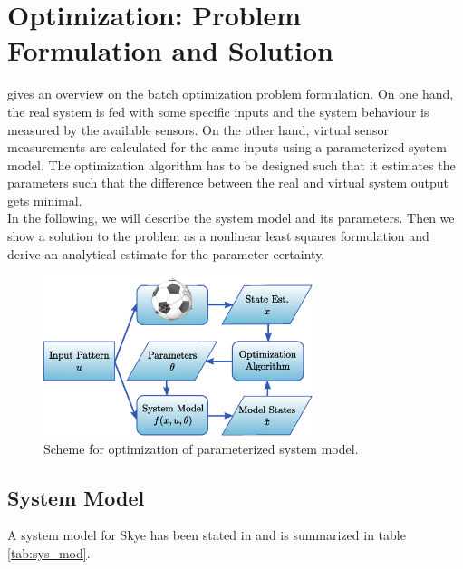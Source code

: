 \chapter{Optimization: Problem Formulation and Solution}
\label{chap:batch}

 gives an overview on the batch optimization problem formulation.
On one hand, the real system is fed with some specific inputs and the system behaviour is measured by the available sensors.
On the other hand, virtual sensor measurements are calculated for the same inputs using a parameterized system model.
The optimization algorithm has to be designed such that it estimates the parameters such that the difference between the real and virtual system output gets minimal.
\\


In the following, we will describe the system model and its parameters.
Then we show a solution to the problem as a nonlinear least squares formulation and derive an analytical estimate for the parameter certainty.

\begin{figure}[btp]
\centering
\includegraphics[width=0.7\textwidth]{images/problem_formulation.eps}
\caption{Scheme for optimization of parameterized system model.}
\label{fig:batch_opti}
\end{figure}

\section{System Model}
\label{sec:system_model}
A system model for Skye has been stated in \citep{Weichart2012} and is summarized in table \ref{tab:sys_mod}.

